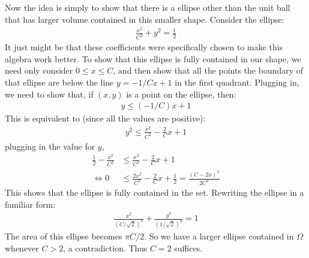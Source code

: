 \documentclass[12pt]{article}
\theoremstyle{definitionstyle}
\newcommand{\1}{\mathds 1}
\begin{document}
\begin{enumerate}
        \begin{figure}[H]
            \centering
        \end{figure}

        Now the idea is simply to show that there is a ellipse other than the unit ball that has larger volume contained in this smaller shape. Consider the ellipse:
        \begin{align*}
            \frac{x^2}{C^2} + y^2 = \frac{1}{2}
        \end{align*}
        It just might be that these coefficients were specifically chosen to make this algebra work better. To show that this ellipse is fully contained in our shape, we need only consider $0 \leq x \leq C$, and then show that all the points the boundary of that ellipse are below the line $y = -1/C x + 1$ in the first quadrant. Plugging in, we need to show that, if $(x,y)$ is a point on the ellipse, then:
        \begin{align*}
            y \leq (-1/C)x + 1
        \end{align*}
        This is equivalent to (since all the values are positive):
        \begin{align*}
            y^2 \leq \frac{x^2}{C^2} - \frac{2}{C}x + 1
        \end{align*}
        plugging in the value for $y$, 
        \begin{align*}
            \frac 12 - \frac{x^2}{C^2} &\leq \frac{x^2}{C^2} - \frac{2}{C}x + 1 \\
             \iff 0 &\leq \frac{2x^2}{C^2} - \frac{2}{C}x + \frac 12 = \frac{(C-2x)^2}{2C^2}
        \end{align*}
        This shows that the ellipse is fully contained in the set. Rewriting the ellipse in a familiar form:
        \begin{align*}
            \frac{x^2}{(C/\sqrt{2})^2} + \frac{y^2}{(1/\sqrt{2})^2} = 1
        \end{align*}
        The area of this ellipse becomes $\pi C/2$. So we have a larger ellipse contained in $\Omega$ whenever $C > 2$, a contradiction. Thus $C = 2$ suffices.
        


\end{enumerate}
\end{document}
